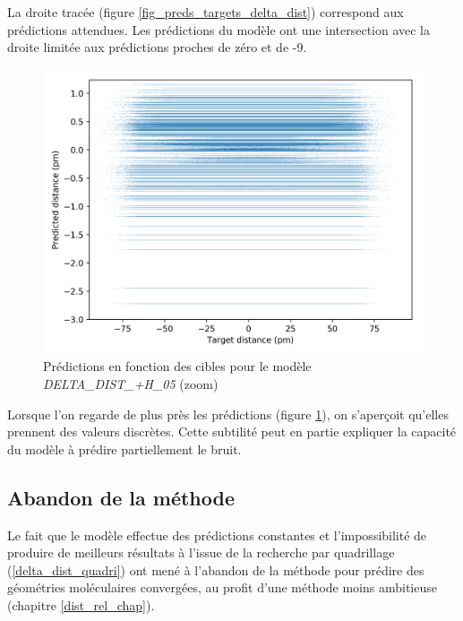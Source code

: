 \par La droite tracée (figure \ref{fig_preds_targets_delta_dist}) correspond aux prédictions attendues. Les prédictions du modèle ont une intersection avec la droite limitée aux prédictions proches de zéro et de -9.

\begin{figure}	

	\centering
	
	\includegraphics[scale=0.7]{../figures/DELTA_DIST_+H_05/DELTA_DIST+H_05_preds_targets_zoom.png}	
	
	\caption{Prédictions en fonction des cibles pour le modèle \emph{DELTA\_DIST\_+H\_05} (zoom)}
	\label{fig_zoom_preds_targets_delta_dist}

	
\end{figure}
\par Lorsque l'on regarde de plus près les prédictions (figure \ref{fig_zoom_preds_targets_delta_dist}), on s'aperçoit qu'elles prennent des valeurs discrètes. Cette subtilité peut en partie expliquer la capacité du modèle à prédire partiellement le bruit.

\subsection{Abandon de la méthode}
\label{delta_dist_abandon}

Le fait que le modèle effectue des prédictions constantes et l'impossibilité de produire de meilleurs résultats à l'issue de la recherche par quadrillage (\ref{delta_dist_quadri}) ont mené à l'abandon de la méthode pour prédire des géométries moléculaires convergées, au profit d'une méthode moins ambitieuse (chapitre \ref{dist_rel_chap}).\\

